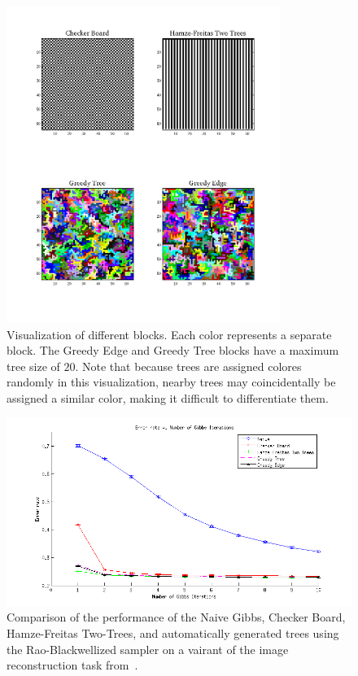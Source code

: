 \documentclass{article} %
\begin{document}
\begin{figure}
\begin{center}
\includegraphics[width=3.5in]{figures/block_maps.png}
\vspace{-.5in}
\caption[]{Visualization of different blocks. Each color represents a separate block. The Greedy Edge and Greedy Tree blocks have a maximum tree size of $20$. Note that because trees are assigned colores randomly in this visualization, nearby trees may coincidentally be assigned a similar color, making it difficult to differentiate them.}
\label{fig:blockMaps}
\end{center}
\end{figure}

\begin{figure}
\begin{center}
\includegraphics[width=5in]{figures/figure7_real}
\caption[]{Comparison of the performance of the Naive Gibbs, Checker Board, Hamze-Freitas Two-Trees, and automatically generated trees using the Rao-Blackwellized sampler on a vairant of the image reconstruction task from~\cite{hamze2004fields}.}
\label{fig:imageRecon}
\end{center}
\end{figure}
\end{document}
